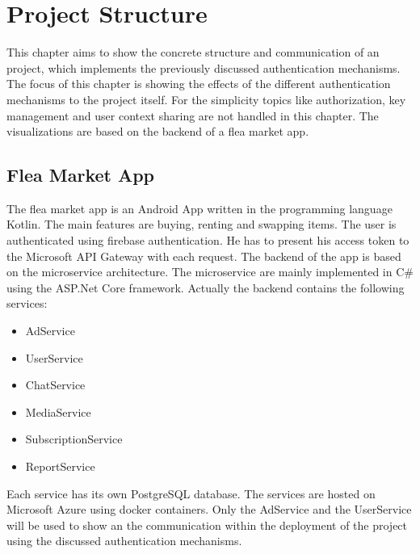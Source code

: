\chapter{Project Structure}
\label{cha:project_structure}
This chapter aims to show the concrete structure and communication of an project, which implements the previously discussed authentication mechanisms.
The focus of this chapter is showing the effects of the different authentication mechanisms to the project itself.
For the simplicity topics like authorization, key management and user context sharing are not handled in this chapter.
The visualizations are based on the backend of a flea market app.

\section{Flea Market App}
The flea market app is an Android App written in the programming language Kotlin.
The main features are buying, renting and swapping items.
The user is authenticated using firebase authentication.
He has to present his access token to the Microsoft API Gateway with each request.
The backend of the app is based on the microservice architecture.
The microservice are mainly implemented in C\# using the ASP.Net Core framework.
Actually the backend contains the following services:
\begin{itemize}
	\item AdService
	\item UserService
	\item ChatService
	\item MediaService
	\item SubscriptionService
	\item ReportService
\end{itemize}
Each service has its own PostgreSQL database.
The services are hosted on Microsoft Azure using docker containers.
Only the AdService and the UserService will be used to show an the communication within the deployment of the project using the discussed authentication mechanisms.

